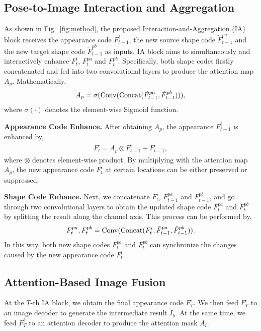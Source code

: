\documentclass{bmvc2k}
\begin{document}
\subsection{Pose-to-Image Interaction and Aggregation}
As shown in Fig.~\ref{fig:method}, the proposed Interaction-and-Aggregation (IA) block receives the appearance code $F_{t-1}^i$, the new source shape code $\tilde{F}_{t-1}^{pa}$ and the new target shape code $\tilde{F}_{t-1}^{pb}$ as inputs.
IA block aims to simultaneously and interactively enhance $F_{t}^i$, $F_{t}^{pa}$ and $F_{t}^{pb}$.
Specifically, both shape codes firstly concatenated and fed into two convolutional layers to produce the attention map $A_p$.
Mathematically,
\begin{equation}
\begin{aligned}
A_p = \sigma({\rm Conv}({\rm Concat}(\tilde{F}_{t-1}^{pa}, \tilde{F}_{t-1}^{pb}))),
\end{aligned}
\end{equation}
where $\sigma(\cdot)$ denotes the element-wise Sigmoid function. 

\noindent \textbf{Appearance Code Enhance.} After obtaining $A_p$, the appearance $F_{t-1}^i$ is enhanced by,
\begin{equation}
\begin{aligned}
F_t^i = A_p \otimes  F_{t-1}^i  + F_{t-1}^i,
\end{aligned}
\end{equation}
where $\otimes$ denotes element-wise product. By multiplying with the attention map $A_p$, the new appearance code $F_t^i$ at certain locations can be either preserved or suppressed. 

\noindent \textbf{Shape Code Enhance.}
Next, we concatenate $F_t^i $, $F_{t-1}^{pa}$ and $F_{t-1}^{pb}$, and go through two convolutional layers to obtain the updated shape code $F_t^{pa}$ and $F_t^{pb}$ by splitting the result along the channel axis.
This process can be performed by,
\begin{equation}
\begin{aligned}
F_{t}^{pa}, F_{t}^{pb} = {\rm Conv} ({\rm Concat}(F_t^i, \tilde{F}_{t-1}^{pa}, \tilde{F}_{t-1}^{pb})).
\end{aligned}
\end{equation}
In this way, both new shape codes $F_{t}^{pa}$ and $F_{t}^{pb}$ can synchronize the changes caused by the new appearance code $F_t^i$. 

\subsection{Attention-Based Image Fusion}
At the $T$-th IA block, we obtain the final appearance code $F_T^{i}$.
We then feed $F_T^{i}$ to an image decoder to generate the intermediate result $\tilde{I}_b$.
At the same time, we feed $F_T^{i}$ to an attention decoder to produce the attention mask $A_i$.
\end{document}
